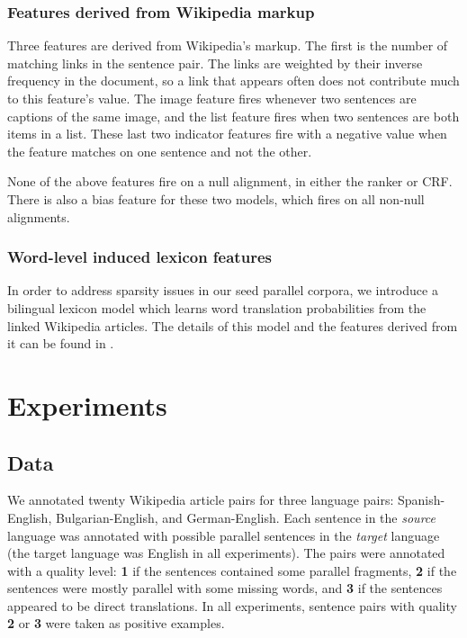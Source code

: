 \subsubsection{Features derived from Wikipedia markup}

Three features are derived from Wikipedia's
markup. The first is the number of matching links in the sentence
pair. The links are weighted by their inverse frequency in the
document, so a link that appears often does not contribute much to
this feature's value.  The image feature fires whenever two
sentences are captions of the same image, and the list feature
fires when two sentences are both items in a list.  These last two
indicator features fire with a negative value when the feature
matches on one sentence and not the other.

None of the above features fire on a null alignment, in either the
ranker or CRF.  There is also a bias feature for these two models, which
fires on all non-null alignments.

\subsubsection{Word-level induced lexicon features}
In order to address sparsity issues in our seed parallel corpora, we introduce a
bilingual lexicon model which learns word translation probabilities from the
linked Wikipedia articles. The details of this model and the features derived
from it can be found in \citep{Smith10}.

\section{Experiments}
\label{sec:exp}

\subsection{Data}
We annotated twenty Wikipedia article pairs for three language pairs: Spanish-English,
Bulgarian-English, and German-English.
Each sentence in the {\em source} language was annotated with
possible parallel sentences in the {\em target} language (the target language was
English in all experiments).  The pairs were annotated with a quality level:
{\bf 1} if the sentences contained some parallel fragments, {\bf 2} if the sentences
were mostly parallel with some missing words, and {\bf 3} if the sentences appeared to be direct
translations.  In all experiments, sentence pairs with quality {\bf 2} or {\bf 3} were
taken as positive examples. 

